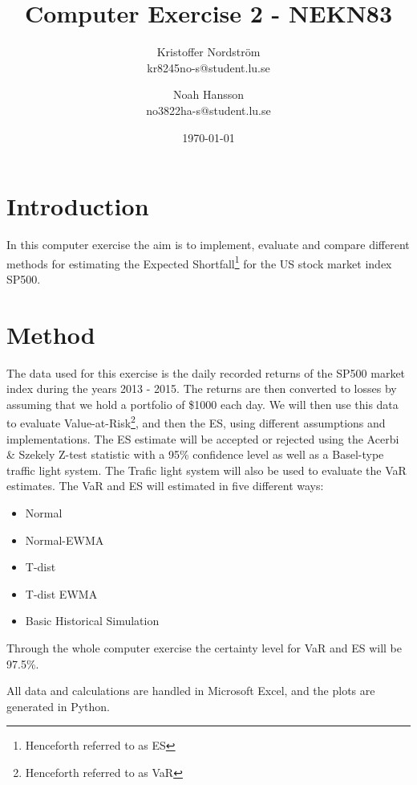 \documentclass[a4paper]{article}
\title{Computer Exercise 2 - NEKN83}
\author{Kristoffer Nordström \\ kr8245no-s@student.lu.se \and  Noah Hansson \\ no3822ha-s@student.lu.se}
\date{\today}
\begin{document}
\maketitle


\section{Introduction}
In this computer exercise the aim is to implement, evaluate and compare different methods for estimating the Expected Shortfall\footnote{Henceforth referred to as ES} for the US stock market index SP500.

\section{Method}
The data used for this exercise is the daily recorded returns of the SP500 market index during the years 2013 - 2015. The returns are then converted to losses by assuming that we hold a portfolio of \$1000 each day. We will then use this data to evaluate Value-at-Risk\footnote{Henceforth referred to as VaR}, and then the ES, using different assumptions and implementations. The ES estimate will be accepted or rejected using the Acerbi \& Szekely Z-test statistic with a 95\% confidence level as well as a Basel-type traffic light system. The Trafic light system will also be used to evaluate the VaR estimates. The VaR and ES will estimated in five different ways:
\begin{itemize}
    \item Normal
    \item Normal-EWMA
    \item T-dist
    \item T-dist EWMA
    \item Basic Historical Simulation
\end{itemize}
Through the whole computer exercise the certainty level for VaR and ES will be 97.5\%. 

All data and calculations are handled in Microsoft Excel, and the plots are generated in Python.
\end{document}

